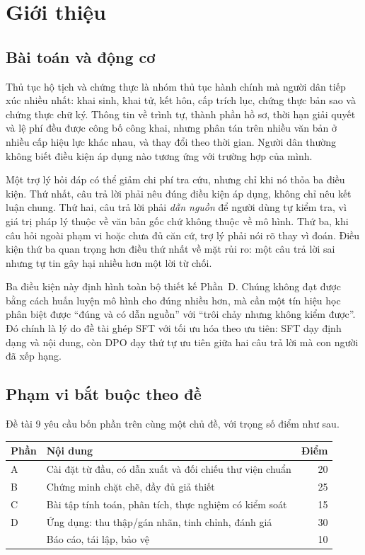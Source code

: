 \section{Giới thiệu}
\label{sec:gioi-thieu}

\subsection{Bài toán và động cơ}

Thủ tục hộ tịch và chứng thực là nhóm thủ tục hành chính mà người dân tiếp xúc
nhiều nhất: khai sinh, khai tử, kết hôn, cấp trích lục, chứng thực bản sao và
chứng thực chữ ký. Thông tin về trình tự, thành phần hồ sơ, thời hạn giải quyết
và lệ phí đều được công bố công khai, nhưng phân tán trên nhiều văn bản ở nhiều
cấp hiệu lực khác nhau, và thay đổi theo thời gian. Người dân thường không biết
điều kiện áp dụng nào tương ứng với trường hợp của mình.

Một trợ lý hỏi đáp có thể giảm chi phí tra cứu, nhưng chỉ khi nó thỏa ba điều
kiện. Thứ nhất, câu trả lời phải nêu đúng điều kiện áp dụng, không chỉ nêu kết
luận chung. Thứ hai, câu trả lời phải \emph{dẫn nguồn} để người dùng tự kiểm tra,
vì giá trị pháp lý thuộc về văn bản gốc chứ không thuộc về mô hình. Thứ ba, khi
câu hỏi ngoài phạm vi hoặc chưa đủ căn cứ, trợ lý phải nói rõ thay vì đoán. Điều
kiện thứ ba quan trọng hơn điều thứ nhất về mặt rủi ro: một câu trả lời sai nhưng
tự tin gây hại nhiều hơn một lời từ chối.

Ba điều kiện này định hình toàn bộ thiết kế Phần~D. Chúng không đạt được bằng cách
huấn luyện mô hình cho đúng nhiều hơn, mà cần một tín hiệu học phân biệt được
``đúng và có dẫn nguồn'' với ``trôi chảy nhưng không kiểm được''. Đó chính là lý do
đề tài ghép SFT với tối ưu hóa theo ưu tiên: SFT dạy định dạng và nội dung, còn DPO
dạy thứ tự ưu tiên giữa hai câu trả lời mà con người đã xếp hạng.

\subsection{Phạm vi bắt buộc theo đề}

Đề tài 9 \cite[tr.~18--19]{de} yêu cầu bốn phần trên cùng một chủ đề, với trọng số
điểm như sau.

\begin{center}
\begin{tabular}{llr}
\toprule
\textbf{Phần} & \textbf{Nội dung} & \textbf{Điểm}\\
\midrule
A & Cài đặt từ đầu, có dẫn xuất và đối chiếu thư viện chuẩn & 20\\
B & Chứng minh chặt chẽ, đầy đủ giả thiết & 25\\
C & Bài tập tính toán, phân tích, thực nghiệm có kiểm soát & 15\\
D & Ứng dụng: thu thập/gán nhãn, tinh chỉnh, đánh giá & 30\\
\midrule
 & Báo cáo, tái lập, bảo vệ & 10\\
\bottomrule
\end{tabular}
\end{center}

